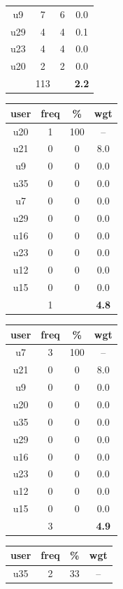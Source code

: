 \begin{table}
\begin{tabular}{ |c|c|c|c| }
	u9 & 7 & 6 & 0.0 \\
	u29 & 4 & 4 & 0.1 \\
	u23 & 4 & 4 & 0.0 \\
	u20 & 2 & 2 & 0.0 \\
	 & 113 & & \textbf{2.2} \\
	\hline
\end{tabular}
\begin{tabular}{ |c|c|c|c| }
	\hline
	\textbf{user} & \textbf{freq} & \textbf{\%} & \textbf{wgt} \\
	\hline
	u20 & 1 & 100 & -- \\
	u21 & 0 & 0 & 8.0 \\
	u9 & 0 & 0 & 0.0 \\
	u35 & 0 & 0 & 0.0 \\
	u7 & 0 & 0 & 0.0 \\
	u29 & 0 & 0 & 0.0 \\
	u16 & 0 & 0 & 0.0 \\
	u23 & 0 & 0 & 0.0 \\
	u12 & 0 & 0 & 0.0 \\
	u15 & 0 & 0 & 0.0 \\
	 & 1 & & \textbf{4.8} \\
	\hline
\end{tabular}
\begin{tabular}{ |c|c|c|c| }
	\hline
	\textbf{user} & \textbf{freq} & \textbf{\%} & \textbf{wgt} \\
	\hline
	u7 & 3 & 100 & -- \\
	u21 & 0 & 0 & 8.0 \\
	u9 & 0 & 0 & 0.0 \\
	u20 & 0 & 0 & 0.0 \\
	u35 & 0 & 0 & 0.0 \\
	u29 & 0 & 0 & 0.0 \\
	u16 & 0 & 0 & 0.0 \\
	u23 & 0 & 0 & 0.0 \\
	u12 & 0 & 0 & 0.0 \\
	u15 & 0 & 0 & 0.0 \\
	 & 3 & & \textbf{4.9} \\
	\hline
\end{tabular}
\begin{tabular}{ |c|c|c|c| }
	\hline
	\textbf{user} & \textbf{freq} & \textbf{\%} & \textbf{wgt} \\
	\hline
	u35 & 2 & 33 & -- \\

\end{tabular}
\end{table}
